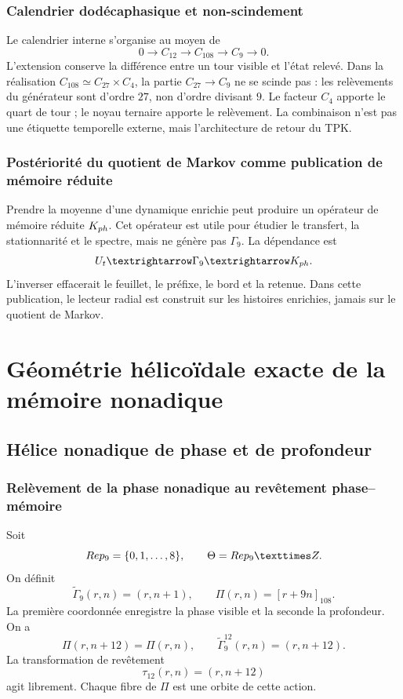 \section{Calendrier dodécaphasique et non-scindement}

Le calendrier interne s'organise au moyen de
\[
 0\longrightarrow C_{12}\longrightarrow C_{108}
 \longrightarrow C_9\longrightarrow0.
\]
L'extension conserve la différence entre un tour visible et l'état relevé. Dans la réalisation \(C_{108}\simeq C_{27}\times C_4\), la partie \(C_{27}\to C_9\) ne se scinde pas : les relèvements du générateur sont d'ordre \(27\), non d'ordre divisant \(9\). Le facteur \(C_4\) apporte le quart de tour ; le noyau ternaire apporte le relèvement. La combinaison n'est pas une étiquette temporelle externe, mais l'architecture de retour du TPK.

\section{Postériorité du quotient de Markov comme publication de mémoire réduite}

Prendre la moyenne d'une dynamique enrichie peut produire un opérateur de mémoire réduite \(K_{ph}\). Cet opérateur est utile pour étudier le transfert, la stationnarité et le spectre, mais ne génère pas \(\Gamma_9\). La dépendance est
\[
 U_t\longrightarrow\Gamma_9\longrightarrow K_{\ph}.
\]
L'inverser effacerait le feuillet, le préfixe, le bord et la retenue. Dans cette publication, le lecteur radial est construit sur les histoires enrichies, jamais sur le quotient de Markov.

\part{Géométrie hélicoïdale exacte de la mémoire nonadique}

\chapter{Hélice nonadique de phase et de profondeur}

\section{Relèvement de la phase nonadique au revêtement phase--mémoire}

Soit
\[
 \operatorname{Rep}_9=\{0,1,\ldots,8\},
 \qquad \widetilde\Theta=\operatorname{Rep}_9\times\Z.
\]
On définit
\begin{equation}
 \widetilde\Gamma_9(r,n)=(r,n+1),
 \qquad
 \Pi(r,n)=[r+9n]_{108}.
 \label{espiral:eq:cobertura-helice}
\end{equation}
La première coordonnée enregistre la phase visible et la seconde la profondeur. On a
\[
 \Pi(r,n+12)=\Pi(r,n),
 \qquad
 \widetilde\Gamma_9^{12}(r,n)=(r,n+12).
\]
La transformation de revêtement
\[
 \tau_{12}(r,n)=(r,n+12)
\]
agit librement. Chaque fibre de \(\Pi\) est une orbite de cette action.


